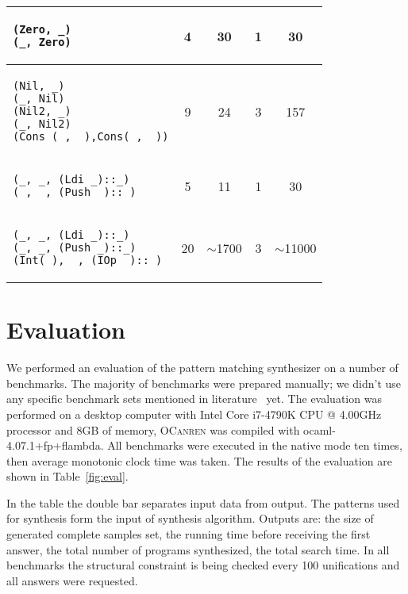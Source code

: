 \begin{table}[H]
\begin{tabular}{|m{3.5cm}||cccc|}
\begin{lstlisting}[basicstyle=\scriptsize]
(Zero, _)
(_, Zero)
    \end{lstlisting} &4&30&1&30
    \\
        \hline
     \begin{lstlisting}[basicstyle=\scriptsize]
(Nil, _)
(_, Nil)
(Nil2, _)
(_, Nil2)
(Cons (_, _),Cons(_, _))
    \end{lstlisting}
     &9&24&3&157                    \\ 
      \hline
     \begin{lstlisting}[basicstyle=\scriptsize]
(_, _, (Ldi _)::_)
(_, _, (Push _)::_)
    \end{lstlisting} &5&11&1&30\\
        \hline      
        \begin{lstlisting}[basicstyle=\scriptsize]
(_, _, (Ldi _)::_)
(_, _, (Push _)::_)
(Int(_), _, (IOp _)::_)
\end{lstlisting}
     &20&$\sim$1700&3&$\sim$11000                    \\ \hline
  \end{tabular}

\end{table}

\FloatBarrier

\section{Evaluation}
\label{sec:eval}


We performed an evaluation of the pattern matching synthesizer on a number of benchmarks.
The majority of benchmarks were prepared manually; we didn't use any specific benchmark sets mentioned in literature~\cite{Scott2000WhenDM} yet.
The evaluation was performed on a desktop computer with Intel Core i7-4790K CPU @ 4.00GHz processor and 8GB of memory,
\textsc{OCanren} was compiled with \mbox{ocaml-4.07.1+fp+flambda}. All benchmarks were executed in the native mode ten times,
then average monotonic clock time was taken. The results of the evaluation are shown in Table~\ref{fig:eval}.

In the table the double bar separates input data from output. %
The patterns used for synthesis form the input of synthesis algorithm.
Outputs are: the size of generated complete samples set, the running time before receiving the
first answer, the total number of programs synthesized, the total search time.
In all benchmarks the structural constraint is being checked every 100 unifications and all answers were requested.

